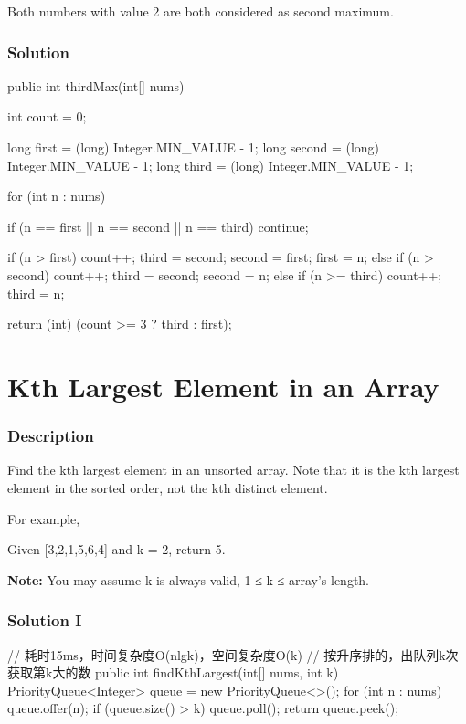 Both numbers with value 2 are both considered as second maximum.
\subsubsection{Solution}

\begin{Code}
public int thirdMax(int[] nums) {
    int count = 0;

    long first = (long) Integer.MIN_VALUE - 1;
    long second = (long) Integer.MIN_VALUE - 1;
    long third = (long) Integer.MIN_VALUE - 1;

    for (int n : nums) {
        if (n == first || n == second || n == third) {
            continue;
        }

        if (n > first) {
            count++;
            third = second;
            second = first;
            first = n;
        } else if (n > second) {
            count++;
            third = second;
            second = n;
        } else if (n >= third) {
            count++;
            third = n;
        }
    }

    return (int) (count >= 3 ? third : first);
}
\end{Code}

\newpage

\section{Kth Largest Element in an Array} %

\subsubsection{Description}
Find the kth largest element in an unsorted array. Note that it is the kth largest element in the sorted order, not the kth distinct element.

For example,

Given [3,2,1,5,6,4] and k = 2, return 5.

\textbf{Note:}
You may assume k is always valid, 1 ≤ k ≤ array's length.
\subsubsection{Solution I}

\begin{Code}
// 耗时15ms，时间复杂度O(nlgk)，空间复杂度O(k)
// 按升序排的，出队列k次获取第k大的数
public int findKthLargest(int[] nums, int k) {
    PriorityQueue<Integer> queue = new PriorityQueue<>();
    for (int n : nums) {
        queue.offer(n);
        if (queue.size() > k) {
            queue.poll();
        }
    }
    return queue.peek();
}
\end{Code}

